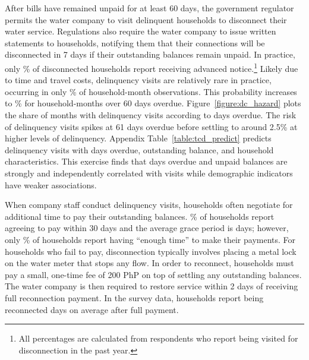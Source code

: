 \documentclass[12pt]{article}
\begin{document}
After bills have remained unpaid for at least 60 days, the government regulator permits the water company to visit delinquent households to disconnect their water service.  Regulations also require the water company to issue written statements to households, notifying them that their connections will be disconnected in 7 days if their outstanding balances remain unpaid.  In practice, only \unskip\% of disconnected households report receiving advanced notice.\footnote{All percentages are calculated from respondents who report being visited for disconnection in the past year. }  Likely due to time and travel costs, delinquency visits are relatively rare in practice, occurring in only \unskip\% of household-month observations.  This probability increases to \unskip\% for household-months over 60 days overdue.  Figure~\ref{figure:dc_hazard} plots the share of months with delinquency visits according to days overdue.  The risk of delinquency visits spikes at 61 days overdue before settling to around 2.5\% at higher levels of delinquency.  Appendix Table~\ref{table:tcd_predict} predicts delinquency visits with days overdue, outstanding balance, and household characteristics.  This exercise finds that days overdue and unpaid balances are strongly and independently correlated with visits while demographic indicators have weaker associations. %

When company staff conduct delinquency visits, households often negotiate for additional time to pay their outstanding balances.  \unskip\% of households report agreeing to pay within 30 days and the average grace period is days; however, only \unskip\% of households report having ``enough time'' to make their payments.  For households who fail to pay, disconnection typically involves placing a metal lock on the water meter that stops any flow.  In order to reconnect, households must pay a small, one-time fee of 200 PhP on top of settling any outstanding balances.  The water company is then required to restore service within 2 days of receiving full reconnection payment.  In the survey data, households report being reconnected days on average after full payment.
\end{document}
